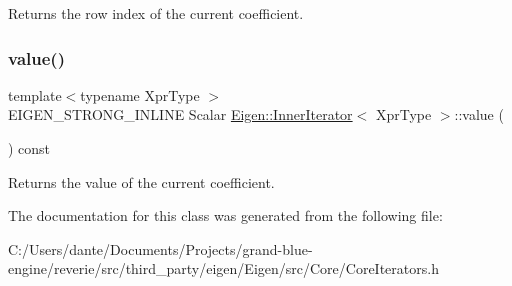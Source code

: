 \begin{DoxyReturn}{Returns}
the row index of the current coefficient. 
\end{DoxyReturn}
\mbox{\label{class_eigen_1_1_inner_iterator_ab04bccb41eb22ffcb92dc61125aab119}} 
\subsubsection{\texorpdfstring{value()}{value()}}
{\footnotesize\ttfamily template$<$typename Xpr\+Type $>$ \\
E\+I\+G\+E\+N\+\_\+\+S\+T\+R\+O\+N\+G\+\_\+\+I\+N\+L\+I\+NE Scalar \mbox{\hyperlink{class_eigen_1_1_inner_iterator}{Eigen\+::\+Inner\+Iterator}}$<$ Xpr\+Type $>$\+::value (\begin{DoxyParamCaption}{ }\end{DoxyParamCaption}) const\hspace{0.3cm}{\ttfamily [inline]}}

\begin{DoxyReturn}{Returns}
the value of the current coefficient. 
\end{DoxyReturn}


The documentation for this class was generated from the following file\+:\begin{DoxyCompactItemize}
\item 
C\+:/\+Users/dante/\+Documents/\+Projects/grand-\/blue-\/engine/reverie/src/third\+\_\+party/eigen/\+Eigen/src/\+Core/Core\+Iterators.\+h\end{DoxyCompactItemize}
